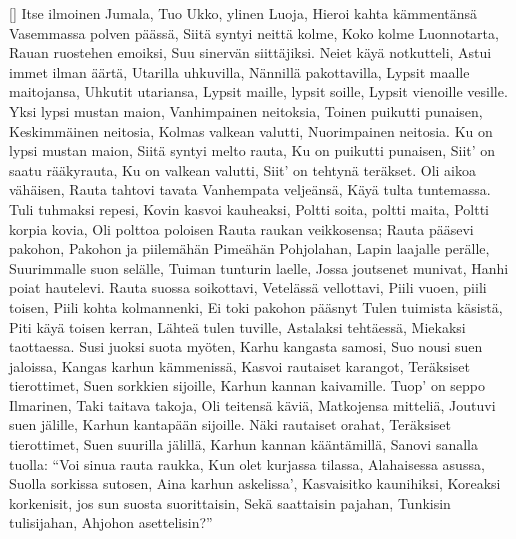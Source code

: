 []
  \beginverse
    Itse ilmoinen Jumala,
    Tuo Ukko, ylinen Luoja,
    Hieroi kahta kämmentänsä
    Vasemmassa polven päässä,
    Siitä syntyi neittä kolme,
    Koko kolme Luonnotarta,
    Rauan ruostehen emoiksi,
    Suu sinervän siittäjiksi.
  \endverse
  \beginverse
    Neiet käyä notkutteli,
    Astui immet ilman äärtä,
    Utarilla uhkuvilla,
    Nännillä pakottavilla,
    Lypsit maalle maitojansa,
    Uhkutit utariansa,
    Lypsit maille, lypsit soille,
    Lypsit vienoille vesille.
    Yksi lypsi mustan maion,
    Vanhimpainen neitoksia,
    Toinen puikutti punaisen,
    Keskimmäinen neitosia,
    Kolmas valkean valutti,
    Nuorimpainen neitosia.
    Ku on lypsi mustan maion,
    Siitä syntyi melto rauta,
    Ku on puikutti punaisen,
    Siit' on saatu rääkyrauta,
    Ku on valkean valutti,
    Siit' on tehtynä teräkset.
  \endverse
  \beginverse
    Oli aikoa vähäisen,
    Rauta tahtovi tavata
    Vanhempata veljeänsä,
    Käyä tulta tuntemassa.
    Tuli tuhmaksi repesi,
    Kovin kasvoi kauheaksi,
    Poltti soita, poltti maita,
    Poltti korpia kovia,
    Oli polttoa poloisen
    Rauta raukan veikkosensa;
    Rauta pääsevi pakohon,
    Pakohon ja piilemähän
    Pimeähän Pohjolahan,
    Lapin laajalle perälle,
    Suurimmalle suon selälle,
    Tuiman tunturin laelle,
    Jossa joutsenet munivat,
    Hanhi poiat hautelevi.
  \endverse
  \beginverse
    Rauta suossa soikottavi,
    Vetelässä vellottavi,
    Piili vuoen, piili toisen,
    Piili kohta kolmannenki,
    Ei toki pakohon pääsnyt
    Tulen tuimista käsistä,
    Piti käyä toisen kerran,
    Lähteä tulen tuville,
    Astalaksi tehtäessä,
    Miekaksi taottaessa.
  \endverse
  \beginverse
    Susi juoksi suota myöten,
    Karhu kangasta samosi,
    Suo nousi suen jaloissa,
    Kangas karhun kämmenissä,
    Kasvoi rautaiset karangot,
    Teräksiset tierottimet,
    Suen sorkkien sijoille,
    Karhun kannan kaivamille.
  \endverse
  \beginverse
    Tuop' on seppo Ilmarinen,
    Taki taitava takoja,
    Oli teitensä käviä,
    Matkojensa mitteliä,
    Joutuvi suen jälille,
    Karhun kantapään sijoille.
    Näki rautaiset orahat,
    Teräksiset tierottimet,
    Suen suurilla jälillä,
    Karhun kannan kääntämillä,
    Sanovi sanalla tuolla:
    ``Voi sinua rauta raukka,
    Kun olet kurjassa tilassa,
    Alahaisessa asussa,
    Suolla sorkissa sutosen,
    Aina karhun askelissa',
    Kasvaisitko kaunihiksi,
    Koreaksi korkenisit,
    jos sun suosta suorittaisin,
    Sekä saattaisin pajahan,
    Tunkisin tulisijahan,
    Ahjohon asettelisin?''
  \endverse
  \beginverse
